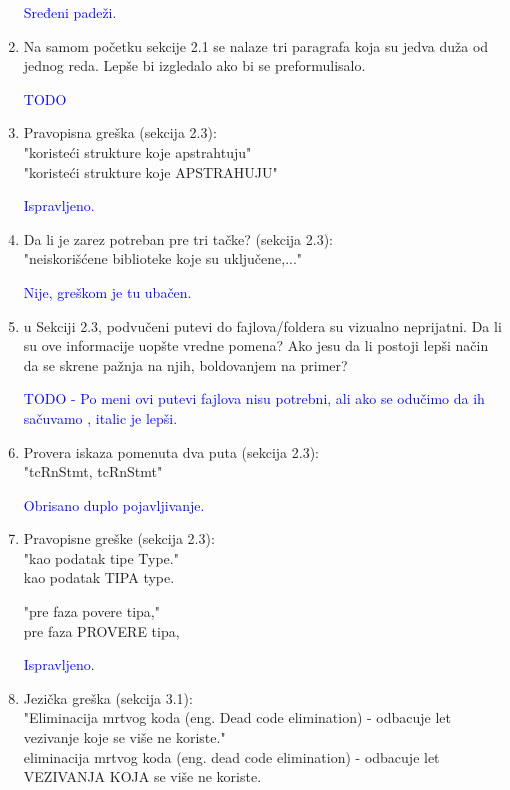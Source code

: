 \documentclass[a4paper]{report}
\newcommand{\odgovor}[1]{\textcolor{blue}{#1}}
\begin{document}
\begin{enumerate}
		\odgovor{Sređeni padeži.}
		
		
		\item Na samom početku sekcije 2.1 se nalaze tri paragrafa koja su jedva duža od jednog reda. Lepše bi izgledalo ako bi se preformulisalo.
		
		\odgovor{TODO}
		
		\item Pravopisna greška (sekcija 2.3):\\
		"koristeći strukture koje apstrahtuju"\\
		"koristeći strukture koje APSTRAHUJU"
		
		\odgovor{Ispravljeno.}
		
		\item Da li je zarez potreban pre tri tačke? (sekcija 2.3):\\
		"neiskorišćene biblioteke koje su uključene,..."
		
		\odgovor{Nije, greškom je tu ubačen.}
		
		\item u Sekciji 2.3, podvučeni putevi do fajlova/foldera su vizualno neprijatni. Da li su ove informacije uopšte vredne pomena? Ako jesu da li postoji lepši način da se skrene pažnja na njih, boldovanjem na primer?	
		
		\odgovor{TODO - Po meni ovi putevi fajlova nisu potrebni, ali ako se odučimo da ih sačuvamo , italic je lepši.}
		
		\item Provera iskaza pomenuta dva puta (sekcija 2.3):\\
		"tcRnStmt, tcRnStmt"
		
		\odgovor{Obrisano duplo pojavljivanje.}
		
		\item Pravopisne greške (sekcija 2.3):\\
		"kao podatak tipe Type."\\
		kao podatak TIPA type.
		
		"pre faza povere tipa,"\\
		pre faza PROVERE tipa,
		
		\odgovor{Ispravljeno.}
		
		\item Jezička greška (sekcija 3.1):\\
		"Eliminacija mrtvog koda (eng. Dead code elimination) - odbacuje
		let vezivanje koje se više ne koriste."\\
		eliminacija mrtvog koda (eng. dead code elimination) - odbacuje
		let VEZIVANJA KOJA se više ne koriste.
		

\end{enumerate}
\end{document}
